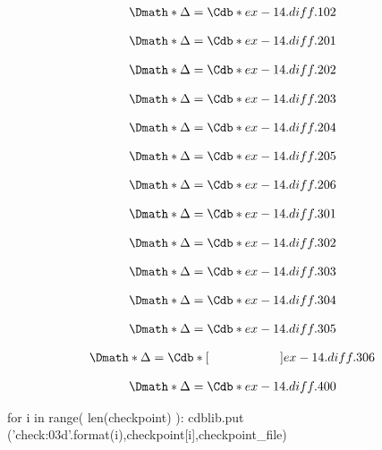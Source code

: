 \documentclass[12pt]{cdblatex}
\begin{document}
\begin{dgroup*}
   \Dmath*{ \Delta = \Cdb*{ex-14.diff.102}}
\end{dgroup*}

\begin{dgroup*}
   \Dmath*{ \Delta = \Cdb*{ex-14.diff.201}}
\end{dgroup*}

\begin{dgroup*}
   \Dmath*{ \Delta = \Cdb*{ex-14.diff.202}}
\end{dgroup*}

\begin{dgroup*}
   \Dmath*{ \Delta = \Cdb*{ex-14.diff.203}}
\end{dgroup*}

\begin{dgroup*}
   \Dmath*{ \Delta = \Cdb*{ex-14.diff.204}}
\end{dgroup*}

\begin{dgroup*}
   \Dmath*{ \Delta = \Cdb*{ex-14.diff.205}}
\end{dgroup*}

\begin{dgroup*}
   \Dmath*{ \Delta = \Cdb*{ex-14.diff.206}}
\end{dgroup*}

\begin{dgroup*}
   \Dmath*{ \Delta = \Cdb*{ex-14.diff.301}}
\end{dgroup*}

\begin{dgroup*}
   \Dmath*{ \Delta = \Cdb*{ex-14.diff.302}}
\end{dgroup*}

\begin{dgroup*}
   \Dmath*{ \Delta = \Cdb*{ex-14.diff.303}}
\end{dgroup*}

\begin{dgroup*}
   \Dmath*{ \Delta = \Cdb*{ex-14.diff.304}}
\end{dgroup*}

\begin{dgroup*}
   \Dmath*{ \Delta = \Cdb*{ex-14.diff.305}}
\end{dgroup*}

\begin{dgroup*}
   \Dmath*{ \Delta = \Cdb*[\hskip2.0cm\hfill]{ex-14.diff.306}}
\end{dgroup*}

\begin{dgroup*}
   \Dmath*{ \Delta = \Cdb*{ex-14.diff.400}}
\end{dgroup*}

\clearpage


\bgroup
{}
\begin{cadabra}
   for i in range( len(checkpoint) ):
      cdblib.put ('check{:03d}'.format(i),checkpoint[i],checkpoint_file)
\end{cadabra}
\egroup
\end{document}
